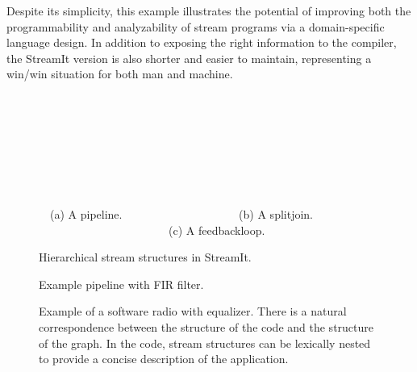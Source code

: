 Despite its simplicity, this example illustrates the potential of
improving both the programmability and analyzability of stream
programs via a domain-specific language design.  In addition to
exposing the right information to the compiler, the StreamIt version
is also shorter and easier to maintain, representing a win/win
situation for both man and machine.

\begin{figure}[t]
\vspace{0.4\baselineskip}
\centering
\begin{minipage}{0.598in}
{\centering
{} \\
}
\end{minipage} 
\hspace{0.45in}
\begin{minipage}{1.69in}
{\centering
{} \\
}
\end{minipage}
\hspace{0.45in}
\begin{minipage}{1.326in}
{\centering
{} \\
}
\end{minipage}
\\ ~ \\ {\mbox{~}\protect\small \mbox{~}(a) A pipeline. ~~~~~~~~~~~~~~~~~~~~(b) A splitjoin. ~~~~~~~~~~~~~~~~~~~~~~~(c) A feedbackloop.~~~~~~~~}
\caption{Hierarchical stream structures in StreamIt.\protect\label{fig:structures}}
\end{figure}

\begin{figure}[t]
\centering
{}
\hspace{0.15in}
\caption{Example pipeline with FIR filter.\protect\label{fig:pipeline}}
\vspace{0.4\baselineskip}
\end{figure}

\begin{figure}[t]
\centering
{}
\caption[Example of a software radio with equalizer.]{Example of a
  software radio with equalizer.  There is a natural correspondence
  between the structure of the code and the structure of the graph.
  In the code, stream structures can be lexically nested to provide a
  concise description of the application.\protect\label{fig:fm-radio}}
\end{figure}

